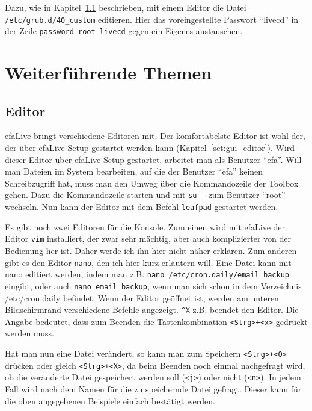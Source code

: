 \documentclass[a4paper,12pt,twoside]{article}
\begin{document}
Dazu, wie in Kapitel~\ref{sct:editor} beschrieben, mit
einem Editor die Datei \linebreak[4]\texttt{/etc/grub.d/40\_custom} editieren. Hier das
voreingestellte Passwort "`livecd"' in der
Zeile \texttt{password root livecd} gegen ein
Eigenes austauschen.


\section{Weiterführende Themen}
\label{sct:weitere_themen}
\subsection{Editor}
\label{sct:editor}
efaLive bringt verschiedene Editoren
mit. Der komfortabelste Editor ist wohl der, der über efaLive-Setup
gestartet werden kann (Kapitel~\ref{sct:gui_editor}).
Wird dieser Editor über efaLive-Setup gestartet, arbeitet man als
Benutzer "`efa"'. Will man Dateien im System
bearbeiten, auf die der Benutzer "`efa"'
keinen Schreibzugriff hat, muss man den Umweg über die Kommandozeile
der Toolbox gehen. Dazu die Kommandozeile starten und mit
\texttt{su -} zum Benutzer
"`root"' wechseln. Nun kann der Editor mit
dem Befehl \texttt{leafpad} gestartet werden.

Es gibt noch zwei Editoren für die Konsole. Zum einen wird mit efaLive
der Editor \texttt{vim} installiert, der zwar sehr
mächtig, aber auch komplizierter von der Bedienung her ist. Daher werde
ich ihn hier nicht näher erklären. Zum anderen gibt es den Editor
\texttt{nano}, den ich hier kurz erläutern will.
Eine Datei kann mit nano editiert werden, indem man z.B.
\texttt{nano /etc/cron.daily/email\_backup}
eingibt, oder auch \texttt{nano email\_backup},
wenn man sich schon in dem Verzeichnis /etc/cron.daily befindet. Wenn
der Editor geöffnet ist, werden am unteren Bildschirmrand verschiedene
Befehle angezeigt. \texttt{\^{}X} z.B. beendet den
Editor. Die Angabe bedeutet, dass zum Beenden die Tastenkombination
\texttt{{\textless}Strg{\textgreater}+{\textless}x{\textgreater}} gedrückt
werden muss.

Hat man nun eine Datei verändert, so kann man zum Speichern
\texttt{{\textless}Strg{\textgreater}+{\textless}O{\textgreater}} drücken oder
gleich \texttt{{\textless}Strg{\textgreater}+{\textless}X{\textgreater}}, da
beim Beenden noch einmal nachgefragt wird, ob die veränderte Datei
gespeichert werden soll (\texttt{{\textless}j{\textgreater}}) oder nicht
(\texttt{{\textless}n{\textgreater}}). In jedem Fall wird nach dem Namen für die
zu speichernde Datei gefragt. Dieser kann für die oben angegebenen
Beispiele einfach bestätigt werden.
\end{document}
